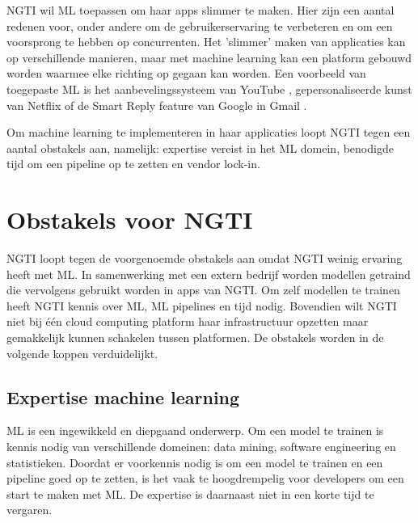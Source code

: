 NGTI wil ML toepassen om haar apps slimmer te maken. Hier zijn een aantal redenen voor, onder andere om de gebruikerservaring te verbeteren en om een voorsprong te hebben op concurrenten. Het 'slimmer' maken van applicaties kan op verschillende manieren, maar met machine learning kan een platform gebouwd worden waarmee elke richting op gegaan kan worden. Een voorbeeld van toegepaste ML is het aanbevelingssysteem van YouTube \cite{youtube-recommendation-system}, gepersonaliseerde kunst van Netflix \cite{netflix-personalized-art} of de Smart Reply feature van Google in Gmail \cite{smart-reply-gmail}.

Om machine learning te implementeren in haar applicaties loopt NGTI tegen een aantal obstakels aan, namelijk: expertise vereist in het ML domein, benodigde tijd om een pipeline op te zetten en vendor lock-in.

\section{Obstakels voor NGTI}\label{sec:ch2-obstakels-voor-ngti}
NGTI loopt tegen de voorgenoemde obstakels aan omdat NGTI weinig ervaring heeft met ML. In samenwerking met een extern bedrijf worden modellen getraind die vervolgens gebruikt worden in apps van NGTI. Om zelf modellen te trainen heeft NGTI kennis over ML, ML pipelines en tijd nodig. Bovendien wilt NGTI niet bij één cloud computing platform haar infrastructuur opzetten maar gemakkelijk kunnen schakelen tussen platformen. De obstakels worden in de volgende koppen verduidelijkt.

\subsection{Expertise machine learning}\label{subsec:ch2-expertise-machine-learning}
ML is een ingewikkeld en diepgaand onderwerp. Om een model te trainen is kennis nodig van verschillende domeinen: data mining, software engineering en statistieken. Doordat er voorkennis nodig is om een model te trainen en een pipeline goed op te zetten, is het vaak te hoogdrempelig voor developers om een start te maken met ML. De expertise is daarnaast niet in een korte tijd te vergaren.

